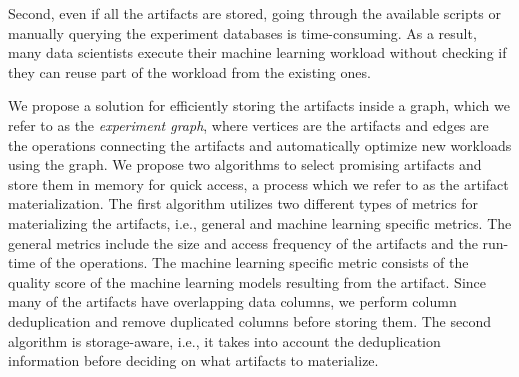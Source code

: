 Second, even if all the artifacts are stored, going through the available scripts or manually querying the experiment databases is time-consuming. 
As a result, many data scientists execute their machine learning workload without checking if they can reuse part of the workload from the existing ones. 

We propose a solution for efficiently storing the artifacts inside a graph, which we refer to as the \textit{experiment graph}, where vertices are the artifacts and edges are the operations connecting the artifacts and automatically optimize new workloads using the graph.
We propose two algorithms to select promising artifacts and store them in memory for quick access, a process which we refer to as the artifact materialization.
The first algorithm utilizes two different types of metrics for materializing the artifacts, i.e., general and machine learning specific metrics.
The general metrics include the size and access frequency of the artifacts and the run-time of the operations.
The machine learning specific metric consists of the quality score of the machine learning models resulting from the artifact.
Since many of the artifacts have overlapping data columns, we perform column deduplication and remove duplicated columns before storing them.
The second algorithm is storage-aware, i.e., it takes into account the deduplication information before deciding on what artifacts to materialize.

